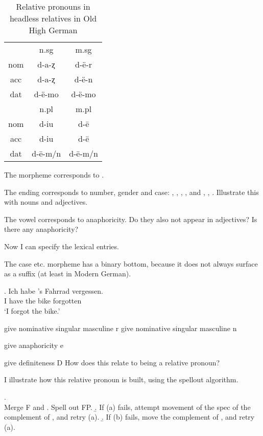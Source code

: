 \begin{table}[H]\label{tbl:paradigmohg}
 \center
 \caption {Relative pronouns in headless relatives in Old High German}
  \begin{tabular}{ccc}
  \toprule
              & \ac{n}.\ac{sg}  & \ac{m}.\ac{sg} \\
        \cmidrule{2-3}
    \ac{nom}  & d-a-ȥ           & d-ë-r          \\
    \ac{acc}  & d-a-ȥ           & d-ë-n          \\
    \ac{dat}  & d-ë-mo          & d-ë-mo         \\
    \bottomrule
         & \ac{n}.\ac{pl}       & \ac{m}.\ac{pl} \\
          \cmidrule{2-3}
    \ac{nom}  & d-iu            &  d-ē           \\
    \ac{acc}  & d-iu            &  d-ē           \\
    \ac{dat}  & d-ē-m/n         &  d-ē-m/n       \\
    \bottomrule
  \end{tabular}
\end{table}

The  morpheme corresponds to .

The ending corresponds to number, gender and case: , , , ,  and , , . Illustrate this with nouns and adjectives.

The vowel corresponds to anaphoricity.
Do they also not appear in adjectives? Is there any anaphoricity?

Now I can specify the lexical entries.

The case etc. morpheme has a binary bottom, because it does not always surface as a suffix (at least in Modern German).

\exg. Ich habe 's Fahrrad vergessen.\\
 I have the bike forgotten\\
 `I forgot the bike.'

give nominative singular masculine r
give nominative singular masculine n

give anaphoricity e

give definiteness D How does this relate to being a relative pronoun?

I illustrate how this relative pronoun is built, using the spellout algorithm.

\ex. \\
Merge F and \label{ex:spellout}
 \a. Spell out FP.
 \b. If (a) fails, attempt movement of the spec of the complement of , and retry (a).
 \b. If (b) fails, move the complement of , and retry (a).

